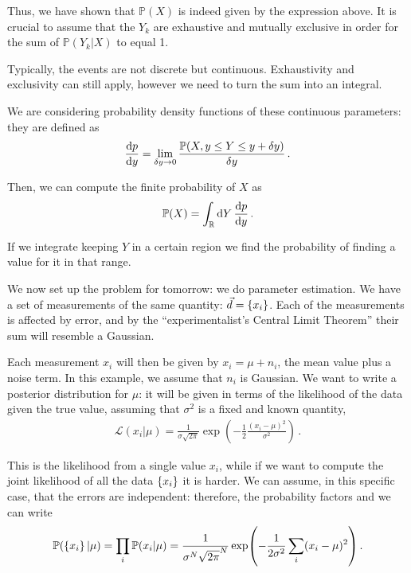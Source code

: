 \documentclass[main.tex]{subfiles}
\begin{document}
Thus, we have shown that \(\mathbb{P}(X)\) is indeed given by the expression above. 
It is crucial to assume that the \(Y_k\) are exhaustive and mutually exclusive in order for the sum of \(\mathbb{P}(Y_k | X)\) to equal 1.

Typically, the events are not discrete but continuous. Exhaustivity and exclusivity can still apply, however we need to turn the sum into an integral. 

We are considering probability density functions of these continuous parameters: they are defined as 
%
\begin{align}
\dv{p}{y}(X, Y = y) = \lim_{ \delta y \to 0} \frac{\mathbb{P}(X, y \leq Y \leq y + \delta y)}{ \delta y}
\,.
\end{align}

Then, we can compute the finite probability of \(X\) as 
%
\begin{align}
\mathbb{P}(X) = \int_{\mathbb{R}}  \dd{Y} \dv{p}{y} (X, Y)
\,.
\end{align}

If we integrate keeping \(Y\) in a certain region we find the probability of finding a value for it in that range. 

We now set up the problem for tomorrow: we do parameter estimation. 
We have a set of measurements of the same quantity: \(\vec{d} = \qty{x_i}\). Each of the measurements is affected by error, and by the ``experimentalist's Central Limit Theorem'' their sum will resemble a Gaussian. 

Each measurement \(x_i\) will then be given by \(x_i = \mu + n_i\), the mean value plus a noise term. 
In this example, we assume that \(n_i\) is Gaussian. 
We want to write a posterior distribution for \(\mu \): it will be given in terms of the likelihood of the data given the true value, assuming that \(\sigma^2\) is a fixed and known quantity, 
%
\begin{align}
\mathscr{L} (x_i| \mu ) = \frac{1}{\sigma \sqrt{2 \pi }} \exp(- \frac{1}{2} \frac{(x_i - \mu )^2}{\sigma^2})
\,.
\end{align}

This is the likelihood from a single value \(x_i\), while if we want to compute the joint likelihood of all the data \(\qty{x_i}\) it is harder. 
We can assume, in this specific case, that the errors are independent: therefore, the probability factors and we can write 
%
\begin{align}
\mathbb{P}(\qty{x_i} | \mu ) = \prod_i \mathbb{P}(x_i | \mu )
= \frac{1}{\sigma^{N} \sqrt{2 \pi }^{N}} \exp(- \frac{1}{2 \sigma^2} \sum _{i} (x_i - \mu )^2)
\,.
\end{align}
\end{document}
